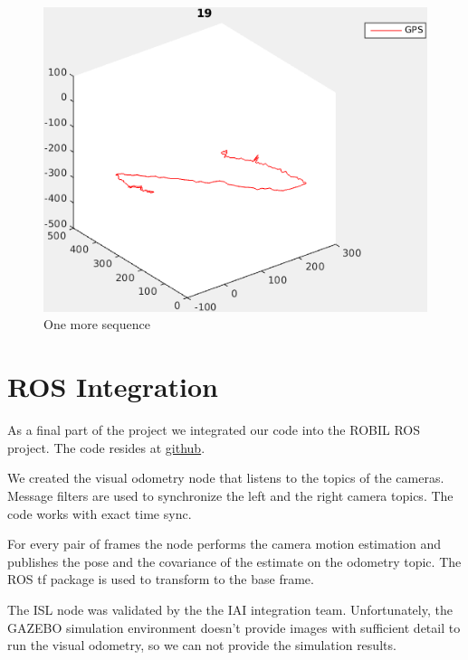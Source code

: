 \documentclass{report}
\begin{document}
\begin{figure}
  \begin{minipage}[b]{\textwidth}
    \centering
    \includegraphics[width=.5\textwidth]{19_path}
  \end{minipage}%

  \caption{One more sequence}\label{fig:1}
\end{figure}

\chapter{ROS Integration}

As a final part of the project we integrated our code into the ROBIL ROS project.  The code resides at \href{https://github.com/iosp/robil2/pull/289}{github}.

We created the visual odometry node that listens to the topics of the cameras. Message filters are used to synchronize the left and the right camera topics.  The code works with exact time sync.

For every pair of frames the node performs the camera motion estimation and publishes the pose and the covariance of the estimate on the odometry topic.  The ROS tf package is used to transform to the base frame.

The ISL node was validated by the the IAI integration team. Unfortunately, the GAZEBO simulation environment doesn't provide images with sufficient detail to run the visual odometry, so we can not provide the simulation results.

\clearpage


\end{document}
